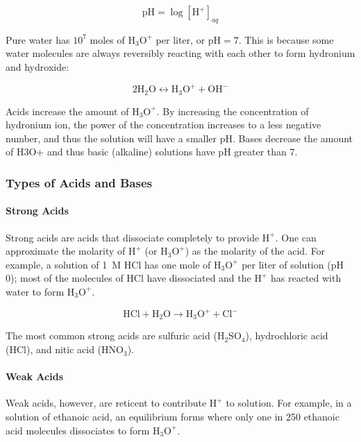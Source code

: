 \[ \mathrm{pH} = \log{[\mathrm{H}^{+}]_{aq}} \]

Pure water has $ 10^{7} $ moles of $\mathrm{H}_3 \mathrm{O}^{+}$ per liter, or $ \mathrm{pH} = 7 $. This is because some water molecules are always reversibly reacting with each other to form hydronium and hydroxide:

\[ 2\mathrm{H}_2\mathrm{O} \longleftrightarrow \mathrm{H}_3 \mathrm{O}^{+} + \mathrm{OH}^{-} \]

Acids increase the amount of $\mathrm{H}_3 \mathrm{O}^{+}$. By increasing the concentration of hydronium ion, the power of the concentration increases to a less negative number, and thus the solution will have a smaller pH. Bases decrease the amount of H3O+ and thus basic (alkaline) solutions have pH greater than 7.

\subsubsection{Types of Acids and Bases}

\paragraph{Strong Acids}

Strong acids are acids that dissociate completely to provide $\mathrm{H}^{+}$. One can approximate the molarity of $\mathrm{H}^{+}$ (or $\mathrm{H}_3 \mathrm{O}^{+}$) as the molarity of the acid. For example, a solution of 1~M HCl has one mole of $\mathrm{H}_3 \mathrm{O}^{+}$ per liter of solution (pH 0); most of the molecules of HCl have dissociated and the $\mathrm{H}^{+}$ has reacted with water to form $\mathrm{H}_3\mathrm{O}^{+}$.

\[ \mathrm{HCl} + \mathrm{H}_2\mathrm{O} \longrightarrow \mathrm{H}_3 \mathrm{O}^{+} + \mathrm{Cl}^{-} \]

The most common strong acids are sulfuric acid ($\mathrm{H}_2\mathrm{SO}_4$), hydrochloric acid (HCl), and nitic acid ($\mathrm{HNO}_3$).

\paragraph{Weak Acids}

Weak acids, however, are reticent to contribute $\mathrm{H}^{+}$ to solution. For example, in a solution of ethanoic acid, an equilibrium forms where only one in 250 ethanoic acid molecules dissociates to form $\mathrm{H}_3 \mathrm{O}^{+}$.

